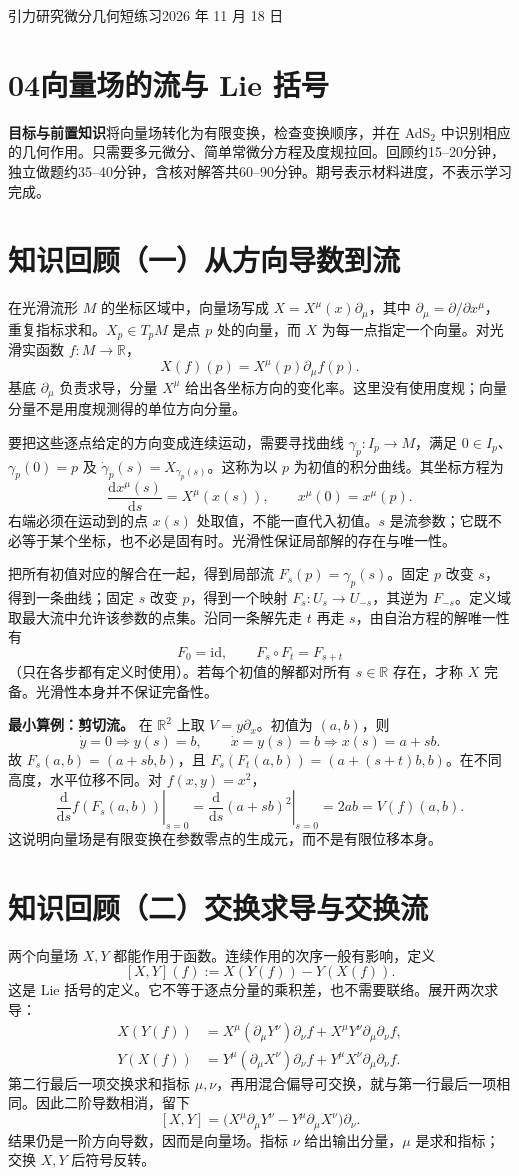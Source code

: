 \documentclass[11pt,a4paper]{article}
\newcommand{\D}{\mathrm d}
\newcommand{\head}[1]{\section*{\color{teal}#1}}
\begin{document}
{\large 引力研究微分几何短练习\hfill 2026 年 11 月 18 日}
\head{04\quad 向量场的流与 Lie 括号}
\textbf{目标与前置知识}\quad 将向量场转化为有限变换，检查变换顺序，并在 AdS$_2$ 中识别相应的几何作用。只需要多元微分、简单常微分方程及度规拉回。回顾约15--20分钟，独立做题约35--40分钟，含核对解答共60--90分钟。期号表示材料进度，不表示学习完成。
\head{知识回顾（一）\quad 从方向导数到流}
在光滑流形 $M$ 的坐标区域中，向量场写成 $X=X^\mu(x)\partial_\mu$，其中 $\partial_\mu=\partial/\partial x^\mu$，重复指标求和。$X_p\in T_pM$ 是点 $p$ 处的向量，而 $X$ 为每一点指定一个向量。对光滑实函数 $f:M\to\mathbb R$，
\[
 X(f)(p)=X^\mu(p)\partial_\mu f(p).
\]
基底 $\partial_\mu$ 负责求导，分量 $X^\mu$ 给出各坐标方向的变化率。这里没有使用度规；向量分量不是用度规测得的单位方向分量。

要把这些逐点给定的方向变成连续运动，需要寻找曲线 $\gamma_p:I_p\to M$，满足 $0\in I_p$、$\gamma_p(0)=p$ 及 $\dot\gamma_p(s)=X_{\gamma_p(s)}$。这称为以 $p$ 为初值的积分曲线。其坐标方程为
\[
 \frac{\D x^\mu(s)}{\D s}=X^\mu(x(s)),\qquad x^\mu(0)=x^\mu(p).
\]
右端必须在运动到的点 $x(s)$ 处取值，不能一直代入初值。$s$ 是流参数；它既不必等于某个坐标，也不必是固有时。光滑性保证局部解的存在与唯一性。

把所有初值对应的解合在一起，得到局部流 $F_s(p)=\gamma_p(s)$。固定 $p$ 改变 $s$，得到一条曲线；固定 $s$ 改变 $p$，得到一个映射 $F_s:U_s\to U_{-s}$，其逆为 $F_{-s}$。定义域取最大流中允许该参数的点集。沿同一条解先走 $t$ 再走 $s$，由自治方程的解唯一性有
\[
 F_0=\mathrm{id},\qquad F_s\circ F_t=F_{s+t}
\]
（只在各步都有定义时使用）。若每个初值的解都对所有 $s\in\mathbb R$ 存在，才称 $X$ 完备。光滑性本身并不保证完备性。

\textbf{最小算例：剪切流。} 在 $\mathbb R^2$ 上取 $V=y\partial_x$。初值为 $(a,b)$，则
\[
 \dot y=0\Rightarrow y(s)=b,\qquad
 \dot x=y(s)=b\Rightarrow x(s)=a+sb.
\]
故 $F_s(a,b)=(a+sb,b)$，且 $F_s(F_t(a,b))=(a+(s+t)b,b)$。在不同高度，水平位移不同。对 $f(x,y)=x^2$，
\[
 \left.\frac{\D}{\D s}f(F_s(a,b))\right|_{s=0}
 =\left.\frac{\D}{\D s}(a+sb)^2\right|_{s=0}=2ab=V(f)(a,b).
\]
这说明向量场是有限变换在参数零点的生成元，而不是有限位移本身。
\newpage
\head{知识回顾（二）\quad 交换求导与交换流}
两个向量场 $X,Y$ 都能作用于函数。连续作用的次序一般有影响，定义
\[
 [X,Y](f):=X(Y(f))-Y(X(f)).
\]
这是 Lie 括号的定义。它不等于逐点分量的乘积差，也不需要联络。展开两次求导：
\begin{align*}
 X(Y(f))&=X^\mu(\partial_\mu Y^\nu)\partial_\nu f
             +X^\mu Y^\nu\partial_\mu\partial_\nu f,\\
 Y(X(f))&=Y^\mu(\partial_\mu X^\nu)\partial_\nu f
             +Y^\mu X^\nu\partial_\mu\partial_\nu f.
\end{align*}
第二行最后一项交换求和指标 $\mu,\nu$，再用混合偏导可交换，就与第一行最后一项相同。因此二阶导数相消，留下
\[
 [X,Y]=\bigl(X^\mu\partial_\mu Y^\nu-Y^\mu\partial_\mu X^\nu\bigr)\partial_\nu.
\]
结果仍是一阶方向导数，因而是向量场。指标 $\nu$ 给出输出分量，$\mu$ 是求和指标；交换 $X,Y$ 后符号反转。
\end{document}
